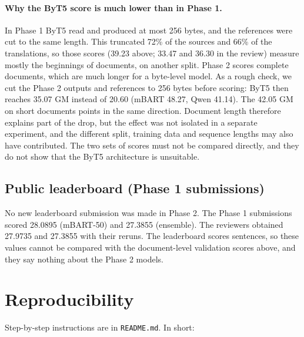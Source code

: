 \documentclass[a4paper,12pt]{article}
\begin{document}
\paragraph{Why the ByT5 score is much lower than in Phase 1.}
In Phase 1 ByT5 read and produced at most 256 bytes, and the references were cut to the same length. This truncated 72\% of the sources and 66\% of the translations, so those scores (39.23 above; 33.47 and 36.30 in the review) measure mostly the beginnings of documents, on another split. Phase 2 scores complete documents, which are much longer for a byte-level model. As a rough check, we cut the Phase 2 outputs and references to 256 bytes before scoring: ByT5 then reaches 35.07 GM instead of 20.60 (mBART 48.27, Qwen 41.14). The 42.05 GM on short documents points in the same direction. Document length therefore explains part of the drop, but the effect was not isolated in a separate experiment, and the different split, training data and sequence lengths may also have contributed. The two sets of scores must not be compared directly, and they do not show that the ByT5 architecture is unsuitable.

\subsection{Public leaderboard (Phase 1 submissions)}
No new leaderboard submission was made in Phase 2. The Phase 1 submissions scored 28.0895 (mBART-50) and 27.3855 (ensemble). The reviewers obtained 27.9735 and 27.3855 with their reruns. The leaderboard scores sentences, so these values cannot be compared with the document-level validation scores above, and they say nothing about the Phase 2 models.

\section{Reproducibility}
\label{sec:repro}
Step-by-step instructions are in \texttt{README.md}. In short:
\end{document}
